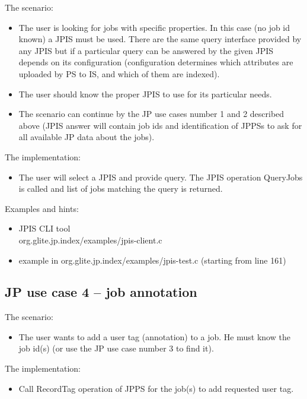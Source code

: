 The scenario:
\begin{itemize}
 \item The user is looking for jobs with specific properties. In this case
  (no job id known) a JPIS must be used. There are the same query interface
  provided by any JPIS but if a particular query can be answered by
  the given JPIS depends on its configuration (configuration
  determines which attributes are uploaded by PS to IS, and which of
  them are indexed).
 \item The user should know the proper JPIS to use for its particular
  needs.
 \item The scenario can continue by the JP use cases number 1 and 2 described
  above (JPIS answer will contain job ids and identification of JPPSs
  to ask for all available JP data about the jobs).
\end{itemize}

The implementation:
\begin{itemize}
 \item The user will select a JPIS and provide query. The JPIS operation
  QueryJobs is called and list of jobs matching the query is returned.
\end{itemize}

Examples and hints:
\begin{itemize}
 \item JPIS CLI tool\\
   org.glite.jp.index/examples/jpis-client.c

 \item example in org.glite.jp.index/examples/jpis-test.c (starting
   from line 161)
\end{itemize}

\subsection{JP use case 4 -- job annotation}

The scenario:
\begin{itemize}
 \item The user wants to add a user tag (annotation) to a job. He must know
  the job id(s) (or use the JP use case number 3 to find it).
\end{itemize}

The implementation:
\begin{itemize}
 \item Call RecordTag operation of JPPS for the job(s) to add requested
  user tag.
\end{itemize}

